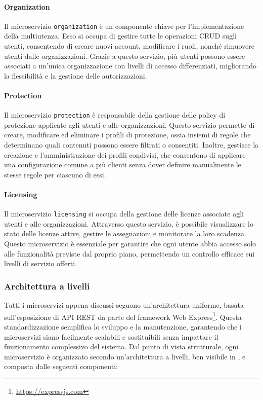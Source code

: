 \paragraph{Organization}
Il microservizio \texttt{organization} è un componente chiave per l'implementazione della multiutenza. Esso si occupa di gestire tutte le operazioni CRUD sugli utenti, consentendo di creare nuovi account, modificare i ruoli, nonché rimuovere utenti dalle organizzazioni.
Grazie a questo servizio, più utenti possono essere associati a un'unica organizzazione con livelli di accesso differenziati, migliorando la flessibilità e la gestione delle autorizzazioni.

\paragraph{Protection}
Il microservizio \texttt{protection} è responsabile della gestione delle policy di protezione applicate agli utenti e alle organizzazioni. Questo servizio permette di creare, modificare ed eliminare i profili di protezione, ossia insiemi di regole che determinano quali contenuti possono essere filtrati o consentiti.
Inoltre, gestisce la creazione e l’amministrazione dei profili condivisi, che consentono di applicare una configurazione comune a più clienti senza dover definire manualmente le stesse regole per ciascuno di essi.

\paragraph{Licensing}
Il microservizio \texttt{licensing} si occupa della gestione delle licenze associate agli utenti e alle organizzazioni. Attraverso questo servizio, è possibile visualizzare lo stato delle licenze attive, gestire le assegnazioni e monitorare la loro scadenza.
Questo microservizio è essenziale per garantire che ogni utente abbia accesso solo alle funzionalità previste dal proprio piano, permettendo un controllo efficace sui livelli di servizio offerti.

\subsubsection{Architettura a livelli}
Tutti i microservizi appena discussi seguono un'architettura uniforme, basata sull'esposizione di API REST da parte del framework Web Express\footnote{\url{https://expressjs.com}}. Questa standardizzazione semplifica lo sviluppo e la manutenzione, garantendo che i microservizi siano facilmente scalabili e sostituibili senza impattare il funzionamento complessivo del sistema. Dal punto di vista strutturale, ogni microservizio è organizzato secondo un'architettura a livelli, ben visibile in , e composta dalle seguenti componenti:

